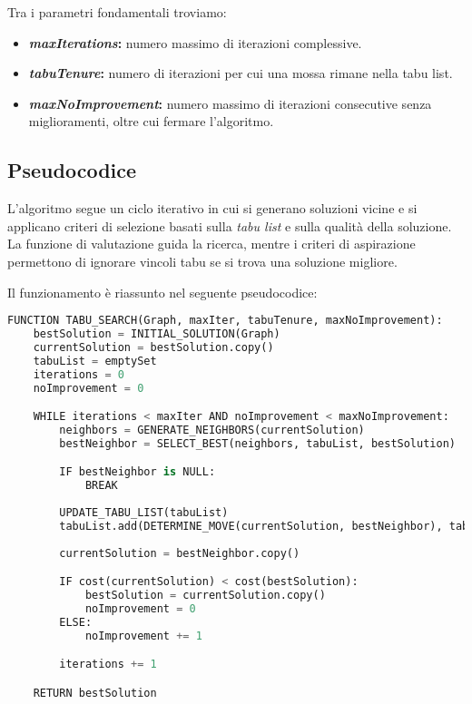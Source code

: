 Tra i parametri fondamentali troviamo:
\begin{itemize}
    \item \textbf{\emph{maxIterations}:} numero massimo di iterazioni complessive.
    \item \textbf{\emph{tabuTenure}:} numero di iterazioni per cui una mossa rimane nella tabu list.
    \item \textbf{\emph{maxNoImprovement}:} numero massimo di iterazioni consecutive senza miglioramenti, oltre cui fermare l'algoritmo.
\end{itemize}

\subsection{Pseudocodice}

L'algoritmo segue un ciclo iterativo in cui si generano soluzioni vicine e si applicano criteri di selezione basati sulla \textit{tabu list} e sulla qualità della soluzione. La funzione di valutazione guida la ricerca, mentre i criteri di aspirazione permettono di ignorare vincoli tabu se si trova una soluzione migliore.

Il funzionamento è riassunto nel seguente pseudocodice:

\begin{lstlisting}[language=Python, caption=Pseudocodice della Tabu Search]
FUNCTION TABU_SEARCH(Graph, maxIter, tabuTenure, maxNoImprovement):
    bestSolution = INITIAL_SOLUTION(Graph)
    currentSolution = bestSolution.copy()
    tabuList = emptySet
    iterations = 0
    noImprovement = 0

    WHILE iterations < maxIter AND noImprovement < maxNoImprovement:
        neighbors = GENERATE_NEIGHBORS(currentSolution)
        bestNeighbor = SELECT_BEST(neighbors, tabuList, bestSolution)

        IF bestNeighbor is NULL:
            BREAK
        
        UPDATE_TABU_LIST(tabuList)
        tabuList.add(DETERMINE_MOVE(currentSolution, bestNeighbor), tabuTenure)
        
        currentSolution = bestNeighbor.copy()

        IF cost(currentSolution) < cost(bestSolution):
            bestSolution = currentSolution.copy()
            noImprovement = 0
        ELSE:
            noImprovement += 1

        iterations += 1

    RETURN bestSolution
\end{lstlisting}

